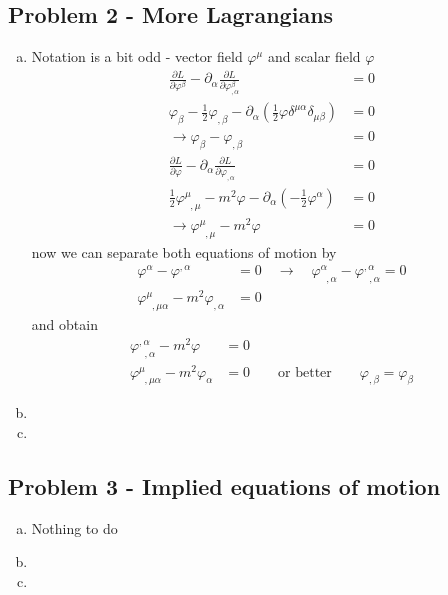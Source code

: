 \documentclass[10pt,a4paper]{book}
\theoremstyle{definition}
\begin{document}
\subsection{Problem 2 - More Lagrangians}
\begin{enumerate}[(a)]
\item Notation is a bit odd - vector field $\varphi^\mu$ and scalar field $\varphi$
\begin{align}
\frac{\partial L}{\partial\varphi^\beta}-\partial_\alpha\frac{\partial L}{\partial\varphi^\beta_{,\alpha}}&=0\\
\varphi_\beta-\frac{1}{2}\varphi_{,\beta}-\partial_\alpha\left(\frac{1}{2}\varphi\delta^{\mu\alpha}\delta_{\mu\beta}\right)&=0\\
\rightarrow\varphi_\beta-\varphi_{,\beta}&=0\\
\frac{\partial L}{\partial\varphi}-\partial_\alpha\frac{\partial L}{\partial\varphi_{,\alpha}}&=0\\
\frac{1}{2}\varphi^\mu_{\;\;,\mu}-m^2\varphi-\partial_\alpha\left(-\frac{1}{2}\varphi^\alpha\right)&=0\\
\rightarrow \varphi^\mu_{\;\;,\mu}-m^2\varphi&=0
\end{align}
now we can separate both equations of motion by
\begin{align}
\varphi^\alpha-\varphi^{,\alpha}&=0\quad\rightarrow\quad \varphi^\alpha_{\;\;,\alpha}-\varphi^{,\alpha}_{\;\;,\alpha}=0\\
\varphi^\mu_{\;\;,\mu\alpha}-m^2\varphi_{,\alpha}&=0
\end{align}
and obtain
\begin{align}
\varphi^{,\alpha}_{\;\;,\alpha}-m^2\varphi&=0\\
\varphi^\mu_{\;\;,\mu\alpha}-m^2\varphi_\alpha&=0\qquad\text{or better}\qquad\varphi_{,\beta}=\varphi_\beta
\end{align}
\item
\item
\end{enumerate}

\subsection{Problem 3 - Implied equations of motion}
\begin{enumerate}[(a)]
\item Nothing to do
\item 
\item
\end{enumerate}
\end{document}
